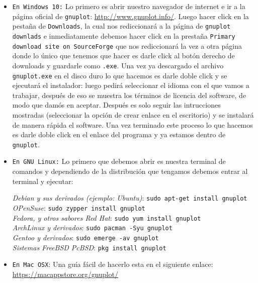 \documentclass[11.5pt,a4paper]{article}
\begin{document}
\begin{itemize}
\item \texttt{En Windows 10:} Lo primero es abrir nuestro navegador de internet e ir a la página oficial de \texttt{gnuplot}: \url{http://www.gnuplot.info/}. Luego hacer click en la pestaña de \texttt{Downloads}, la cual nos rediccionará a la página de \texttt{gnuplot downlads} e inmediatamente debemos hacer click en la prestaña \texttt{Primary download site on SourceForge} que nos rediccionará la vez a otra página donde lo único que tenemos que hacer es darle click al botón derecho de downloads y guardarle como \texttt{.exe}. Una vez ya descargado el archivo \texttt{gnuplot.exe} en el disco duro lo que hacemos es darle doble click y se ejecutará el instalador: luego pedirá seleccionar el idioma con el que vamos a trabajar, después de eso se muestra los términos de licencia del software, de modo que damós en aceptar. Después es solo seguir las intrucciones mostradas (seleccionar la opción de crear enlace en el escritorio) y se instalará de manera rápida el software. Una vez terminado este proceso lo que hacemos es darle doble click en el enlace del programa y ya estamos dentro de \texttt{gnuplot}.    

\item \texttt{En GNU Linux:} Lo primero que debemos abrir es nuestra terminal de comandos y dependiendo de la distribución que tengamos debemos entrar al terminal y ejecutar:

\textit{Debian y sus derivados (ejemplo: Ubuntu)}:\hspace{1.0cm}  \texttt{sudo apt-get install gnuplot}\\
\textit{OPenSuse}:\hspace{5.9cm}  \texttt{sudo zypper install gnuplot}\\
\textit{Fedora, y otros sabores Red Hat}:\hspace{2.6cm}  \texttt{sudo yum install gnuplot}\\
\textit{ArchLinux y derivados}:\hspace{4.0cm}  \texttt{sudo pacman -Syu gnuplot}\\
\textit{Gentoo y derivados}:\hspace{4.5cm} \texttt{sudo emerge -av gnuplot}\\
\textit{Sistemas FreeBSD\/ PcBSD}:\hspace{3.4cm} \texttt{pkg install gnuplot}

\item \texttt{En Mac OSX}: Una guía fácil de hacerlo esta en el siguiente enlace: \url{https://macappstore.org/gnuplot/}
\end{itemize}
\end{document}
